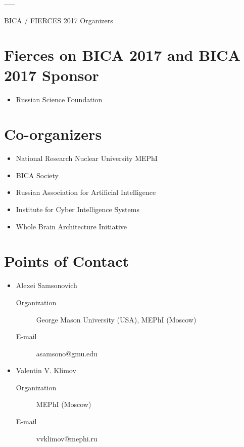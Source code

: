 \documentclass[10pt,fleqn,openany]{book} %
\begin{document}
-----

BICA / FIERCES 2017 Organizers

\section{Fierces on BICA 2017 and BICA 2017 Sponsor}
\begin{itemize}
	\item Russian Science Foundation
\end{itemize}

\section{Co-organizers}
\begin{itemize}
	\item National Research Nuclear University MEPhI
	\item BICA Society
	\item Russian Association for Artificial Intelligence
	\item Institute for Cyber Intelligence Systems
	\item Whole Brain Architecture Initiative
\end{itemize}

\section{Points of Contact}

\begin{itemize}
	\item Alexei Samsonovich
		\begin{description}
			\item[Organization] George Mason University (USA), MEPhI (Moscow)
			\item[E-mail] asamsono@gmu.edu
		\end{description} 
	\item Valentin V. Klimov
		\begin{description}
			\item[Organization] MEPhI (Moscow)
			\item[E-mail]  vvklimov@mephi.ru
		\end{description} 

\end{itemize}

\end{document}

